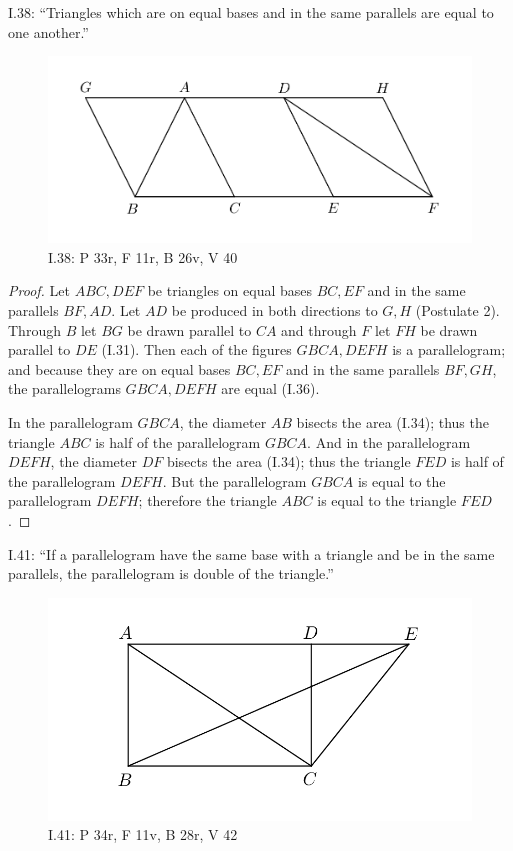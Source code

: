 \documentclass{article}
\begin{document}
I.38: ``Triangles which are on equal bases and in the same
parallels are equal to one another.''

\begin{figure}
\begin{center}
\includegraphics{I38.png}
\end{center}
\caption{I.38:  P 33r, F 11r, B 26v, V 40}
\label{I38}
\end{figure}

\begin{proof}
Let $ABC,DEF$ be triangles on equal bases $BC,EF$ and in the same parallels 
$BF,AD$. 
Let $AD$ be produced in both directions to $G,H$ (Postulate 2). 
Through $B$ let $BG$ be drawn parallel to $CA$ and through $F$ let $FH$ be drawn parallel
to $DE$ (I.31).
Then each of the figures $GBCA,DEFH$ is a parallelogram; 
and because they are on equal bases $BC,EF$ and in the same
parallels $BF,GH$, the parallelograms $GBCA,DEFH$ are equal (I.36).

In the parallelogram $GBCA$, the diameter $AB$ bisects the area (I.34); thus the triangle
$ABC$ is half of the parallelogram $GBCA$.
And in the parallelogram $DEFH$, the diameter $DF$ bisects the area (I.34); thus the triangle
$FED$ is half of the parallelogram $DEFH$. 
But the parallelogram $GBCA$ is equal to the parallelogram $DEFH$; therefore
the triangle $ABC$ is equal to the triangle $FED$.
\end{proof}


I.41: ``If a parallelogram have the same base with a triangle and
be in the same parallels, the parallelogram is double of the
triangle.''

\begin{figure}
\begin{center}
\includegraphics{I41.png}
\end{center}
\caption{I.41:  P 34r, F 11v, B 28r, V 42}
\label{I41}
\end{figure}
\end{document}
